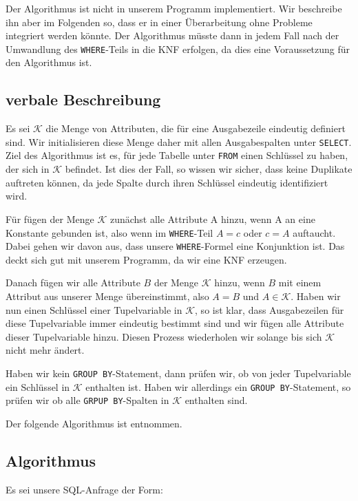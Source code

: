 Der Algorithmus ist nicht in unserem Programm implementiert. Wir beschreibe ihn aber im Folgenden so, dass er in einer Überarbeitung ohne Probleme integriert werden könnte. Der Algorithmus müsste dann in jedem Fall nach der Umwandlung des \verb|WHERE|-Teils in die KNF erfolgen, da dies eine Voraussetzung für den Algorithmus ist.

\subsection{verbale Beschreibung}

Es sei $\mathcal{K}$ die Menge von Attributen, die für eine Ausgabezeile eindeutig definiert sind. Wir initialisieren diese Menge daher mit allen Ausgabespalten unter \verb|SELECT|. Ziel des Algorithmus ist es, für jede Tabelle unter \verb|FROM| einen Schlüssel zu haben, der sich in $\mathcal{K}$ befindet. Ist dies der Fall, so wissen wir sicher, dass keine Duplikate auftreten können, da jede Spalte durch ihren Schlüssel eindeutig identifiziert wird. 

Für fügen der Menge $\mathcal{K}$ zunächst alle Attribute A hinzu, wenn A an eine Konstante gebunden ist, also wenn im \verb|WHERE|-Teil $A=c$ oder $c=A$ auftaucht. Dabei gehen wir davon aus, dass unsere \verb|WHERE|-Formel eine Konjunktion ist. Das deckt sich gut mit unserem Programm, da wir eine KNF erzeugen.

Danach fügen wir alle Attribute $B$ der Menge $\mathcal{K}$ hinzu, wenn $B$ mit einem Attribut aus unserer Menge übereinstimmt, also $A=B$ und $A\in\mathcal{K}$. Haben wir nun einen Schlüssel einer Tupelvariable in $\mathcal{K}$, so ist klar, dass Ausgabezeilen für diese Tupelvariable immer eindeutig bestimmt sind und wir fügen alle Attribute dieser Tupelvariable hinzu. Diesen Prozess wiederholen wir solange bis sich $\mathcal{K}$ nicht mehr ändert. 

Haben wir kein \verb|GROUP BY|-Statement, dann prüfen wir, ob von jeder Tupelvariable ein Schlüssel in $\mathcal{K}$ enthalten ist. Haben wir allerdings ein \verb|GROUP BY|-Statement, so prüfen wir ob alle \verb|GRPUP BY|-Spalten in $\mathcal{K}$ enthalten sind.

Der folgende Algorithmus ist \cite{sql1folien} entnommen.

\subsection{Algorithmus}

Es sei unsere SQL-Anfrage der Form:

